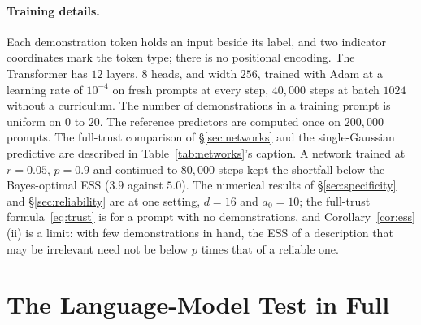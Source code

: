 \documentclass{article}
\begin{document}
\paragraph{Training details.} Each demonstration token holds an input beside its label, and two indicator coordinates mark the token type; there is no positional encoding. The Transformer has $12$ layers, $8$ heads, and width $256$, trained with Adam at a learning rate of $10^{-4}$ on fresh prompts at every step, $40{,}000$ steps at batch $1024$ without a curriculum. The number of demonstrations in a training prompt is uniform on $0$ to $20$. The reference predictors are computed once on $200{,}000$ prompts. The full-trust comparison of \S\ref{sec:networks} and the single-Gaussian predictive are described in Table~\ref{tab:networks}'s caption. A network trained at $r = 0.05$, $p = 0.9$ and continued to $80{,}000$ steps kept the shortfall below the Bayes-optimal ESS ($3.9$ against $5.0$). The numerical results of \S\ref{sec:specificity} and \S\ref{sec:reliability} are at one setting, $d = 16$ and $a_0 = 10$; the full-trust formula~\eqref{eq:trust} is for a prompt with no demonstrations, and Corollary~\ref{cor:ess}(ii) is a limit: with few demonstrations in hand, the ESS of a description that may be irrelevant need not be below $p$ times that of a reliable one.
\begin{table}[t]
\centering\small
\caption{Networks against the reference predictors ($d=5$, $a_0=10$; 20{,}000 evaluation prompts per network, with the standard error of its ESS; the last three rows are the second seed). ``Trained'' and ``calibrated'' are the Bayes-optimal predictors with the training and the test reliability, computed once on 200{,}000 prompts (standard errors below $0.12$) and shown once where they coincide; ``single Gaussian'' is the best predictive that a mean and a variance can express, where the Bayes-optimal predictive is a mixture. ``Trust'' is the network's implied trust with the description alone, on a grid of step $0.05$ plus $0.99$ and $0.999$. The last two columns are the mean regret gap, network minus the trained predictor, over $n = 0, \dots, 20$, with and without a description.}
\label{tab:networks}
\vspace{3pt}

\end{table}

\section{The Language-Model Test in Full}\label{app:llm}
\end{document}
